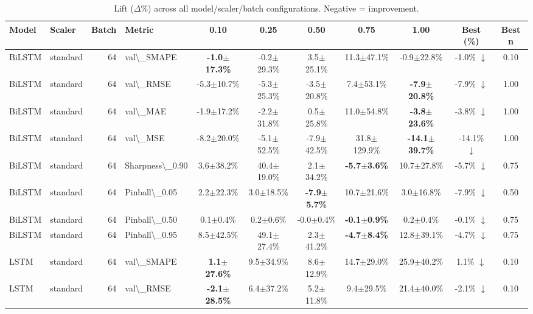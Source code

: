 \begin{table}[t]
\centering
\caption{Lift ($\Delta\%$) across all model/scaler/batch configurations. Negative = improvement.}
\label{tab:lift}
\begin{tabular}{l l r l c c c c c c c}
\toprule
Model & Scaler & Batch & Metric & 0.10 & 0.25 & 0.50 & 0.75 & 1.00 & Best (\%) & Best n \\
\midrule
BiLSTM & standard & 64 & val\textbackslash{}_SMAPE & \textbf{-1.0$\pm$17.3\%} & -0.2$\pm$29.3\% & 3.5$\pm$25.1\% & 11.3$\pm$47.1\% & -0.9$\pm$22.8\% & -1.0\% $\downarrow$ & 0.10 \\
BiLSTM & standard & 64 & val\textbackslash{}_RMSE & -5.3$\pm$10.7\% & -5.3$\pm$25.3\% & -3.5$\pm$20.8\% & 7.4$\pm$53.1\% & \textbf{-7.9$\pm$20.8\%} & -7.9\% $\downarrow$ & 1.00 \\
BiLSTM & standard & 64 & val\textbackslash{}_MAE & -1.9$\pm$17.2\% & -2.2$\pm$31.8\% & 0.5$\pm$25.8\% & 11.0$\pm$54.8\% & \textbf{-3.8$\pm$23.6\%} & -3.8\% $\downarrow$ & 1.00 \\
BiLSTM & standard & 64 & val\textbackslash{}_MSE & -8.2$\pm$20.0\% & -5.1$\pm$52.5\% & -7.9$\pm$42.5\% & 31.8$\pm$129.9\% & \textbf{-14.1$\pm$39.7\%} & -14.1\% $\downarrow$ & 1.00 \\
BiLSTM & standard & 64 & Sharpness\textbackslash{}_0.90 & 3.6$\pm$38.2\% & 40.4$\pm$19.0\% & 2.1$\pm$34.2\% & \textbf{-5.7$\pm$3.6\%} & 10.7$\pm$27.8\% & -5.7\% $\downarrow$ & 0.75 \\
BiLSTM & standard & 64 & Pinball\textbackslash{}_0.05 & 2.2$\pm$22.3\% & 3.0$\pm$18.5\% & \textbf{-7.9$\pm$5.7\%} & 10.7$\pm$21.6\% & 3.0$\pm$16.8\% & -7.9\% $\downarrow$ & 0.50 \\
BiLSTM & standard & 64 & Pinball\textbackslash{}_0.50 & 0.1$\pm$0.4\% & 0.2$\pm$0.6\% & -0.0$\pm$0.4\% & \textbf{-0.1$\pm$0.9\%} & 0.2$\pm$0.4\% & -0.1\% $\downarrow$ & 0.75 \\
BiLSTM & standard & 64 & Pinball\textbackslash{}_0.95 & 8.5$\pm$42.5\% & 49.1$\pm$27.4\% & 2.3$\pm$41.2\% & \textbf{-4.7$\pm$8.4\%} & 12.8$\pm$39.1\% & -4.7\% $\downarrow$ & 0.75 \\
LSTM & standard & 64 & val\textbackslash{}_SMAPE & \textbf{1.1$\pm$27.6\%} & 9.5$\pm$34.9\% & 8.6$\pm$12.9\% & 14.7$\pm$29.0\% & 25.9$\pm$40.2\% & 1.1\% $\downarrow$ & 0.10 \\
LSTM & standard & 64 & val\textbackslash{}_RMSE & \textbf{-2.1$\pm$28.5\%} & 6.4$\pm$37.2\% & 5.2$\pm$11.8\% & 9.4$\pm$29.5\% & 21.4$\pm$40.0\% & -2.1\% $\downarrow$ & 0.10 \\

\end{tabular}
\end{table}
